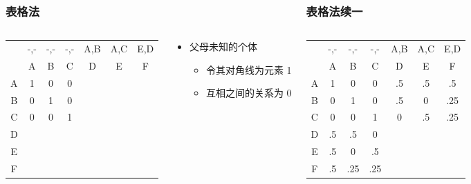 \documentclass[serif,aspectratio=169]{beamer}
\begin{document}
\begin{frame}
\begin{columns}
\begin{frame}
  \frametitle{表格法}
  \begin{columns}
    \begin{column}{.5\textwidth}
      \centering
      \begin{tabular}{c|ccc|ccc}
        & -,- & -,- & -,- & A,B & A,C & E,D\\
        & A & B & C & D & E & F\\\hline
        A & 1 & 0 & 0\\
        B & 0 & 1 & 0\\
        C & 0 & 0 & 1\\\hline
        D & & &\\
        E & & &\\
        F & & &
      \end{tabular}
    \end{column}

    \begin{column}{.5\textwidth}
      \begin{itemize}
      \item 父母未知的个体
        \begin{itemize}
        \item 令其对角线为元素 1
        \item 互相之间的关系为 0
        \end{itemize}
      \end{itemize}
    \end{column}
  \end{columns}
\end{frame}


\begin{frame}
  \frametitle{表格法\tiny{续一}}
  \begin{columns}
    \begin{column}{.5\textwidth}
      \centering
      \begin{tabular}{c|ccc|ccc}
        & -,- & -,- & -,- & A,B & A,C & E,D\\
        & A & B & C & D & E & F\\\hline
        A & 1 & 0 & 0 & .5 & .5 & .5\\
        B & 0 & 1 & 0 & .5 & 0 & .25\\
        C & 0 & 0 & 1 & 0 & .5 & .25\\\hline
        D & .5 & .5 & 0\\
        E & .5 & 0 & .5\\
        F & .5 & .25 & .25
      \end{tabular}
    \end{column}


\end{columns}
\end{frame}
\end{columns}
\end{frame}
\end{document}
